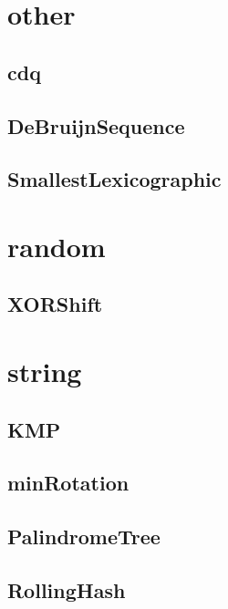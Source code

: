 \documentclass[a4paper,10pt,twocolumn,oneside]{article}
\begin{document}
\section{other}
    \subsection{cdq}
    

    \subsection{DeBruijnSequence}
    

    \subsection{SmallestLexicographic}
    

\section{random}
    \subsection{XORShift}
    

\section{string}
    \subsection{KMP}
    

    \subsection{minRotation}
    

    \subsection{PalindromeTree}
    

    \subsection{RollingHash}
    
\end{document}
